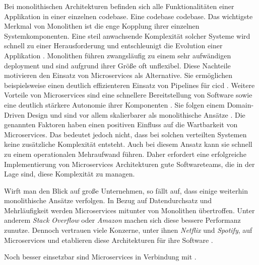 Bei monolithischen Architekturen befinden sich alle Funktionalitäten einer Applikation in einer einzelnen \Gls{codebase}. Eine \Gls{codebase} \glsdesc{codebase}. Das wichtigste Merkmal von Monolithen ist die enge Kopplung ihrer einzelnen Systemkomponenten. Eine steil anwachsende Komplexität solcher Systeme wird schnell zu einer Herausforderung und entschleunigt die Evolution einer Applikation \cite{028:Analyzing-Microservices-and-Monolithic-Systems}. Monolithen führen zwangsläufig zu einem sehr aufwändigen \Gls{deployment} und sind aufgrund ihrer Größe oft unflexibel. Diese Nachteile motivieren den Einsatz von Microservices als Alternative. Sie ermöglichen beispielsweise einen deutlich effizienteren Einsatz von Pipelines für \Gls{cicd} \cite{019:Advanced-DevOps-Environment-for-Microservices-based-Applications}. Weitere Vorteile von Microservices sind eine schnellere Bereitstellung von Software sowie eine deutlich stärkere Autonomie ihrer Komponenten \cite{019:Advanced-DevOps-Environment-for-Microservices-based-Applications,027:Containerized-Microservices-Deployment-Approach}. Sie folgen einem Domain-Driven Design \cite{019:Advanced-DevOps-Environment-for-Microservices-based-Applications} und sind vor allem skalierbarer als monolithische Ansätze \cite{019:Advanced-DevOps-Environment-for-Microservices-based-Applications,027:Containerized-Microservices-Deployment-Approach,028:Analyzing-Microservices-and-Monolithic-Systems}. Die genannten Faktoren haben einen positiven Einfluss auf die Wartbarkeit von Microservices. Das bedeutet jedoch nicht, dass bei solchen verteilten Systemen keine zusätzliche Komplexität entsteht. Auch bei diesem Ansatz kann sie schnell zu einem operationalen Mehraufwand führen. Daher erfordert eine erfolgreiche Implementierung von Microservices Architekturen gute Softwareteams, die in der Lage sind, diese Komplexität zu managen.

Wirft man den Blick auf große Unternehmen, so fällt auf, dass einige weiterhin monolithische Ansätze verfolgen. In Bezug auf Datendurchsatz und Mehrläufigkeit werden Microservices mitunter von Monolithen übertroffen. Unter anderem \textit{Stack Overflow} oder \textit{Amazon} machen sich diese bessere Performanz zunutze. Dennoch vertrauen viele Konzerne, unter ihnen \textit{Netflix} und \textit{Spotify}, auf Microservices und etablieren diese Architekturen für ihre Software \cite{028:Analyzing-Microservices-and-Monolithic-Systems}.

Noch besser einsetzbar sind Microservices in Verbindung mit .

